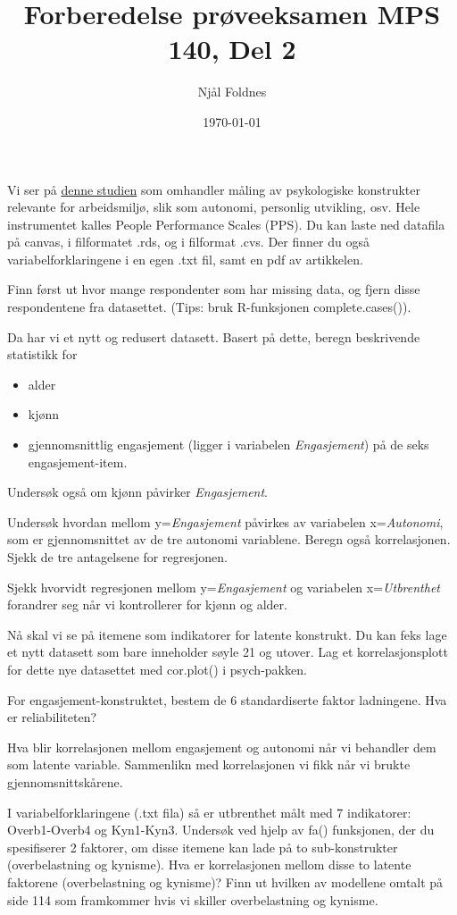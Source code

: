 \documentclass[12pt,a4paper, norsk]{article}
\title{Forberedelse prøveeksamen MPS 140, Del 2}
\author{Njål Foldnes}
\date{\today}
\begin{document}
\maketitle


Vi ser på  \href{https://onlinelibrary.wiley.com/doi/10.1111/sjop.12793}{denne studien} som omhandler måling av  psykologiske konstrukter relevante for arbeidsmiljø, slik som autonomi, personlig utvikling, osv. Hele instrumentet kalles People Performance Scales (PPS).  Du kan laste ned datafila på canvas, i filformatet .rds, og i filformat .cvs. Der finner du også variabelforklaringene i en egen .txt fil, samt en pdf av artikkelen.

Finn først ut hvor mange respondenter som har missing data, og fjern disse respondentene fra datasettet.
(Tips: bruk R-funksjonen \textsf{complete.cases())}. 
	
	Da har vi et nytt og redusert datasett. Basert på dette, beregn beskrivende statistikk for 
	\begin{itemize}
		\item alder
		\item kjønn
		\item gjennomsnittlig engasjement (ligger i variabelen {\it Engasjement}) på de seks engasjement-item.
	\end{itemize}

Undersøk også om kjønn påvirker  {\it Engasjement}. 


Undersøk hvordan mellom  y={\it Engasjement} påvirkes av variabelen x={\it Autonomi}, som er gjennomsnittet av de tre autonomi variablene. Beregn også korrelasjonen. Sjekk de tre antagelsene for regresjonen. 

Sjekk hvorvidt regresjonen mellom y={\it Engasjement} og variabelen x={\it Utbrenthet} forandrer seg når vi kontrollerer for kjønn og alder. 

Nå skal vi se på itemene som indikatorer for latente konstrukt. 
Du kan feks lage et nytt datasett som bare inneholder søyle 21 og utover. Lag et korrelasjonsplott for dette nye datasettet med \textsf{cor.plot()} i psych-pakken. 

For engasjement-konstruktet, bestem de 6 standardiserte faktor ladningene.  Hva er reliabiliteten?

Hva blir korrelasjonen mellom engasjement og autonomi når vi behandler dem som latente variable. 
Sammenlikn med korrelasjonen vi fikk når vi brukte gjennomsnittskårene.


I variabelforklaringene (.txt fila) så er utbrenthet målt med 7 indikatorer: Overb1-Overb4 og Kyn1-Kyn3.
Undersøk ved hjelp av \textsf{fa()} funksjonen, der du spesifiserer 2 faktorer, om disse itemene kan lade på to sub-konstrukter (overbelastning og kynisme). Hva er korrelasjonen mellom disse to latente faktorene (overbelastning og kynisme)?
Finn ut hvilken av modellene omtalt på side 114 som framkommer hvis vi skiller overbelastning og kynisme.
\end{document}
